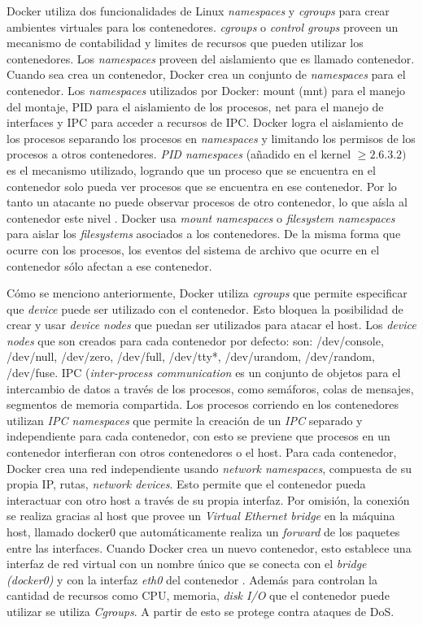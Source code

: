 Docker utiliza dos funcionalidades de Linux \emph{namespaces} y \emph{cgroups} para crear ambientes virtuales para los contenedores. \emph{cgroups} o \emph{control groups} proveen un mecanismo de contabilidad y limites de recursos que pueden utilizar los contenedores\cite{bui2015analysis}. Los \emph{namespaces} proveen del aislamiento que es llamado contenedor. 
Cuando sea crea un contenedor, Docker crea un conjunto de \emph{namespaces} para el contenedor. Los \emph{namespaces} utilizados por Docker: mount (mnt) para el manejo del montaje, PID para el aislamiento de los procesos, net para el manejo de interfaces y IPC para acceder a recursos de IPC. 
Docker logra el aislamiento de los procesos separando los procesos en \emph{namespaces} y limitando los permisos de los procesos a otros contenedores. 
\emph{PID namespaces} (añadido en el kernel \( \geq 2.6.3.2)\) es el mecanismo utilizado, logrando que un proceso que se encuentra en el contenedor solo pueda ver procesos que se encuentra en ese contenedor. Por lo tanto un atacante no puede observar procesos de otro contenedor, lo que aísla al contenedor este nivel \cite{bui2015analysis, LVM:2015:Online}.
Docker usa \emph{mount namespaces} o \emph{filesystem namespaces} para aislar los \emph{filesystems} asociados a los contenedores. De la misma forma que ocurre con los procesos, los eventos del sistema de archivo que ocurre en el contenedor sólo afectan a ese contenedor.

Cómo se menciono anteriormente, Docker utiliza \emph{cgroups} que permite especificar que \emph{device} puede ser utilizado con el contenedor. Esto bloquea la posibilidad de crear y usar \emph{device nodes} que puedan ser utilizados para atacar el host. Los \emph{device nodes} que son creados para cada contenedor por defecto: son: /dev/console, /dev/null, /dev/zero, /dev/full, /dev/tty*, /dev/urandom, /dev/random, /dev/fuse. \cite{walsh:2014:Online}
IPC (\emph{inter-process communication} es un conjunto de objetos para el intercambio de datos a través de los procesos, como semáforos, colas de mensajes, segmentos de memoria compartida. Los procesos corriendo en los contenedores utilizan \emph{IPC namespaces} que permite la creación de un \emph{IPC} separado y independiente para cada contenedor, con esto se previene que procesos en un contenedor interfieran con otros contenedores o el host.
Para cada contenedor, Docker crea una red independiente usando \emph{network namespaces}, compuesta de su propia IP, rutas, \emph{network devices}. Esto permite que el contenedor pueda interactuar con otro host a través de su propia interfaz.
Por omisión, la conexión se realiza gracias al host que provee un \emph{Virtual Ethernet bridge} en la máquina host, llamado docker0 que automáticamente realiza un \emph{forward} de los paquetes entre las interfaces. Cuando Docker crea un nuevo contenedor, esto establece una interfaz de red virtual con un nombre único que se conecta con el \emph{bridge (docker0)} y con la interfaz \emph{eth0} del contenedor \cite{bui2015analysis}.
Además para controlan la cantidad de recursos como CPU, memoria, \emph{disk I/O} que el contenedor puede utilizar se utiliza \emph{Cgroups}. A partir de esto se protege contra ataques de DoS.


